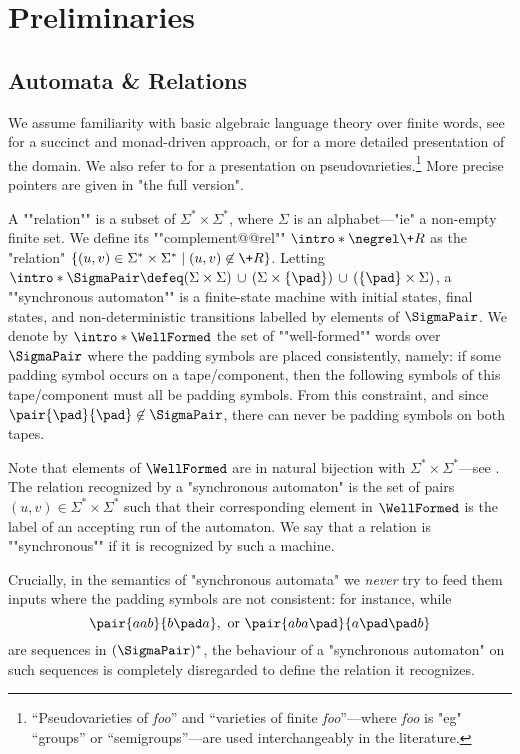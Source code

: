 \section{Preliminaries}
\label{sec:preliminaries}

\subsection{Automata \& Relations}

We assume familiarity with basic algebraic language theory over finite words, see \cite[\S 1, 2, 4, pp.~3--66 \& pp.~107--156]{bojanczyk_languages_2020} for a succinct and monad-driven approach, or \cite[\S I--XIV, pp.~3--247]{pin_mathematical_2022} for a more detailed presentation of the domain.
We also refer to \cite{SW21varieties} for a presentation on pseudovarieties.\footnote{``Pseudovarieties of \emph{foo}'' and ``varieties of finite \emph{foo}''---where \emph{foo} is "eg" ``groups''
or ``semigroups''---are used interchangeably in the literature.}
More precise pointers are given in "the full version".

A \AP""relation"" is a subset of $\Sigma^*\times\Sigma^*$,
where $\Sigma$ is an alphabet---"ie" a non-empty finite set.
We define its \AP""complement@@rel"" \AP$\intro*\negrel \+R$ as the "relation" $\{(u,v) \in \Sigma^*\times \Sigma^* \mid (u,v) \not\in \+R\}$.
Letting
$\intro*\SigmaPair \defeq
(\Sigma \times \Sigma) \,\cup\,
(\Sigma \times \{\pad\}) \,\cup\,
(\{\pad\} \times \Sigma)$, a ""synchronous automaton"" is a finite-state machine with initial states, final states, and
non-deterministic transitions labelled by elements of $\SigmaPair$.
We denote by \AP$\intro*\WellFormed$ the set of \AP""well-formed"" words over $\SigmaPair$ where the padding symbols are placed consistently, namely: if some padding symbol occurs on a tape/component, then the following symbols of this tape/component must all be padding symbols.
From this constraint, and since $\pair{\pad}{\pad} \not\in \SigmaPair$,
there can never be padding symbols on both tapes.

Note that elements of $\WellFormed$ are in natural bijection with $\Sigma^*\times\Sigma^*$---see
.
The relation recognized by a "synchronous automaton" is the set of pairs $(u,v) \in \Sigma^*\times\Sigma^*$ such that their corresponding element in $\WellFormed$ is the label of
an accepting run of the automaton. We say that a relation is \AP""synchronous"" if it is recognized 
by such a machine.

\begin{remark}
	\label{rk:semantic}
	Crucially, in the semantics of "synchronous automata" we \emph{never}
	try to feed them inputs where the padding symbols are not consistent: for instance, while
	\[
		\pair{aab}{b\pad a},
		\text{ or }
		\pair{aba\pad}{a\pad\pad b}	
	\]
	are sequences in $(\SigmaPair)^*$, the behaviour of a "synchronous automaton"
	on such sequences is completely disregarded to define the relation it recognizes. 
\end{remark}

